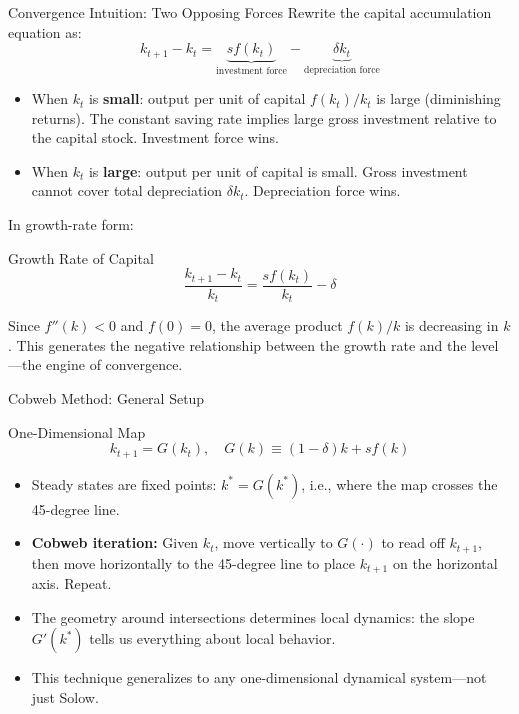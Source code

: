 \documentclass[aspectratio=169,10pt]{beamer}
\begin{document}
\begin{frame}{Convergence Intuition: Two Opposing Forces}
Rewrite the capital accumulation equation as:
\[
k_{t+1} - k_t = \underbrace{sf(k_t)}_{\text{investment force}} - \underbrace{\delta k_t}_{\text{depreciation force}}
\]
\begin{itemize}
  \item When $k_t$ is \textbf{small}: output per unit of capital $f(k_t)/k_t$ is large (diminishing returns). The constant saving rate implies large gross investment relative to the capital stock. Investment force wins.
  \item When $k_t$ is \textbf{large}: output per unit of capital is small. Gross investment cannot cover total depreciation $\delta k_t$. Depreciation force wins.
\end{itemize}

In growth-rate form:
\begin{block}{Growth Rate of Capital}
\[
\frac{k_{t+1}-k_t}{k_t} = \frac{s f(k_t)}{k_t} - \delta
\]
\end{block}
Since $f''(k)<0$ and $f(0)=0$, the average product $f(k)/k$ is decreasing in $k$. This generates the negative relationship between the growth rate and the level---the engine of convergence.
\end{frame}

\begin{frame}{Cobweb Method: General Setup}
\begin{block}{One-Dimensional Map}
\[
k_{t+1}=G(k_t), \quad G(k)\equiv (1-\delta)k+s f(k)
\]
\end{block}
\begin{itemize}
  \item Steady states are fixed points: $k^*=G(k^*)$, i.e., where the map crosses the 45-degree line.
  \item \textbf{Cobweb iteration:} Given $k_t$, move vertically to $G(\cdot)$ to read off $k_{t+1}$, then move horizontally to the 45-degree line to place $k_{t+1}$ on the horizontal axis. Repeat.
  \item The geometry around intersections determines local dynamics: the slope $G'(k^*)$ tells us everything about local behavior.
  \item This technique generalizes to any one-dimensional dynamical system---not just Solow.
\end{itemize}
\end{frame}
\end{document}
